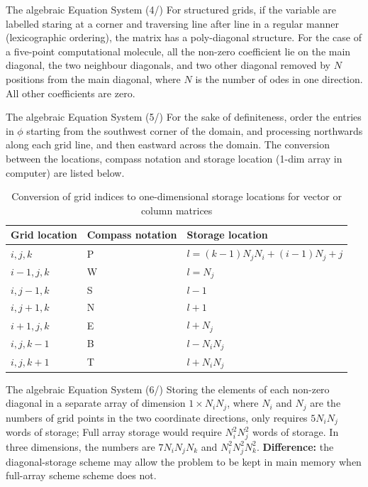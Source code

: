 \documentclass[10pt]{beamer}
\begin{document}
\begin{frame}{The algebraic Equation System (4/)}
For structured grids, if the variable are labelled staring at a corner and traversing line after line in a regular manner (lexicographic ordering), the matrix has a poly-diagonal structure.
\newline \newline
For the case of a five-point computational molecule, all the non-zero coefficient lie on the main diagonal, the two neighbour diagonals, and two other diagonal removed by $N$ positions from the main diagonal, where $N$ is the number of odes in one direction. All other coefficients are zero.
\end{frame}
\begin{frame}{The algebraic Equation System (5/)}
For the sake of definiteness, order the entries in $\phi$ starting from the southwest corner of the domain, and processing northwards along each grid line, and then eastward across the domain. The conversion between the locations, compass notation and storage location (1-dim array in computer) are listed below.
    \begin{table}[H]
    \centering
    \begin{tabular}{lll} 
        \toprule
        Grid location   & Compass notation  & Storage location \\ 
        \midrule
        $i, j, k$   &   P   &   $l = (k-1)N_{j}N_{i}+(i-1)N_{j}+j$ \\
        $i-1, j, k$ &   W   &   $l=N_{j}$ \\
        $i, j-1, k$ &   S   &   $l-1$ \\
        $i, j+1, k$ &   N   &   $l+1$  \\
        $i+1, j, k$ &   E   &   $l+N_{j}$  \\
        $i, j, k-1$ &   B   &   $l-N_{i}N_{j}$ \\
        $i, j, k+1$ &   T   &   $l+N_{i}N_{j}$\\ 
        \bottomrule
    \end{tabular}
    \caption{Conversion of grid indices to one-dimensional storage locations for vector or column matrices}
    \label{tab:storage_location}
\end{table}
\end{frame}
\begin{frame}{The algebraic Equation System (6/)}
Storing the elements of each non-zero diagonal in a separate array of dimension $1\times N_{i}N_{j}$, where $N_{i}$ and $N_{j}$ are the numbers of grid points in the two coordinate directions, only requires $5N_{i}N_{j}$ words of storage; Full array storage would require $N_{i}^{2}N_{j}^{2}$ words of storage. 
\newline \newline
In three dimensions, the numbers are $7N_{i}N_{j}N_{k}$ and  $N_{i}^{2}N_{j}^{2}N_{k}^{2}$.
\newline \newline
\textbf{Difference:} the diagonal-storage scheme may allow the problem to be kept in main memory when full-array scheme scheme does not.
\end{frame}
\end{document}
